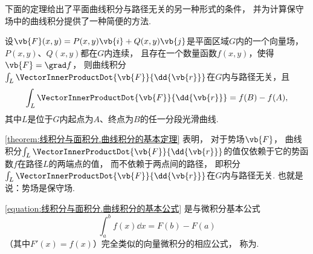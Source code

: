 下面的定理给出了平面曲线积分与路径无关的另一种形式的条件，
并为计算保守场中的曲线积分提供了一种简便的方法.
\begin{theorem}[曲线积分的基本定理]\label{theorem:线积分与面积分.曲线积分的基本定理}
设\(\vb{F}(x,y)=P(x,y)\vb{i}+Q(x,y)\vb{j}\)是平面区域\(G\)内的一个向量场，
\(P(x,y)\)、\(Q(x,y)\)都在\(G\)内连续，
且存在一个数量函数\(f(x,y)\)，使得\(\vb{F}=\grad f\)，
则曲线积分\(\int_L \VectorInnerProductDot{\vb{F}}{\dd{\vb{r}}}\)在\(G\)内与路径无关，且
\begin{equation}\label{equation:线积分与面积分.曲线积分的基本公式}
	\int_L \VectorInnerProductDot{\vb{F}}{\dd{\vb{r}}}
	= f(B)-f(A),
\end{equation}
其中\(L\)是位于\(G\)内起点为\(A\)、终点为\(B\)的任一分段光滑曲线.
\end{theorem}

\cref{theorem:线积分与面积分.曲线积分的基本定理} 表明，
对于势场\(\vb{F}\)，
曲线积分\(\int_L \VectorInnerProductDot{\vb{F}}{\dd{\vb{r}}}\)的值仅依赖于它的势函数\(f\)在路径\(L\)的两端点的值，
而不依赖于两点间的路径，
即积分\(\int_L \VectorInnerProductDot{\vb{F}}{\dd{\vb{r}}}\)在\(G\)内与路径无关.
也就是说：势场是保守场.

\cref{equation:线积分与面积分.曲线积分的基本公式}
是与微积分基本公式\[
	\int_a^b f(x) \dd{x}
	= F(b) - F(a)
\]
（其中\(F'(x) = f(x)\)）完全类似的向量微积分的相应公式，
称为.
